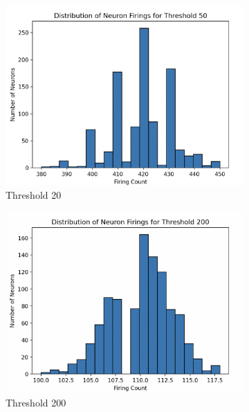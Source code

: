 \documentclass[a4paper,10pt]{article}
\begin{document}
\begin{figure}
\centering
\begin{subfigure}{0.4\textwidth}
    \includegraphics[width=\textwidth]{img/bonus/threshold_50.png}
    \caption{Threshold 20}
\end{subfigure}
\hfill
\begin{subfigure}{0.4\textwidth}
    \includegraphics[width=\textwidth]{img/bonus/threshold_200.png}
    \caption{Threshold 200}
\end{subfigure}
\hfill
\begin{subfigure}{0.4\textwidth}

\end{subfigure}
\end{figure}
\end{document}
